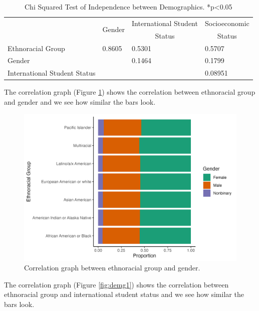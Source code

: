 \documentclass{article}
\begin{document}
\begin{table}[htbp]
  \centering
  \begin{tabular}{|l|l|l|l|}
    \hline
    \multicolumn{1}{|c|}{\multirow{2}{*}{}} &                 \multicolumn{1}{c|}{\multirow{2}{*}{Gender}} & \multicolumn{1}{c|}{International Student} & \multicolumn{1}{c|}{Socioeconomic} \\
    \multicolumn{1}{|c|}{} & \multicolumn{1}{c|}{} & \multicolumn{1}{c|}{Status} & \multicolumn{1}{c|}{Status} \\ \hline
    Ethnoracial Group & 0.8605 & 0.5301 & 0.5707 \\ \hline
    Gender &  & 0.1464 & 0.1799 \\ \hline
    International Student Status &  &  & 0.08951 \\ \hline
  \end{tabular}
  \caption{Chi Squared Test of Independence between Demographics. *p<0.05}
  \label{tab:demographics_chi_indep}
\end{table}

The correlation graph (Figure \ref{fig:demg0}) shows the correlation between ethnoracial group and gender and we see how similar the bars look.



\begin{figure}

{\centering \includegraphics[width=0.9\linewidth]{ethnoracial_group_v_gender} 

}

\caption{Correlation graph between ethnoracial group and gender.}\label{fig:demg0}
\end{figure}

The correlation graph (Figure \ref{fig:demg1}) shows the correlation between ethnoracial group and international student status and we see how similar the bars look.
\end{document}
